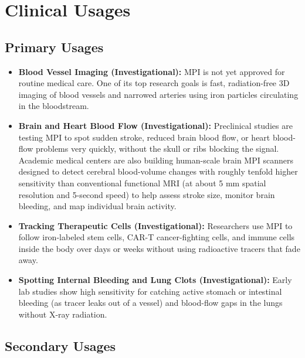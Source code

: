 \section{Clinical Usages}

\subsection{Primary Usages}

\begin{itemize}
    \item \textbf{Blood Vessel Imaging (Investigational):} MPI is not yet approved for routine medical care. One of its top research goals is fast, radiation-free 3D imaging of blood vessels and narrowed arteries using iron particles circulating in the bloodstream.
    \item \textbf{Brain and Heart Blood Flow (Investigational):} Preclinical studies are testing MPI to spot sudden stroke, reduced brain blood flow, or heart blood-flow problems very quickly, without the skull or ribs blocking the signal. Academic medical centers are also building human-scale brain MPI scanners designed to detect cerebral blood-volume changes with roughly tenfold higher sensitivity than conventional functional MRI (at about 5 mm spatial resolution and 5-second speed) to help assess stroke size, monitor brain bleeding, and map individual brain activity.
    \item \textbf{Tracking Therapeutic Cells (Investigational):} Researchers use MPI to follow iron-labeled stem cells, CAR-T cancer-fighting cells, and immune cells inside the body over days or weeks without using radioactive tracers that fade away.
    \item \textbf{Spotting Internal Bleeding and Lung Clots (Investigational):} Early lab studies show high sensitivity for catching active stomach or intestinal bleeding (as tracer leaks out of a vessel) and blood-flow gaps in the lungs without X-ray radiation.
\end{itemize}

\subsection{Secondary Usages}

